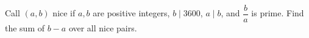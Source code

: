 Call $(a,b)$ nice if $a,b$ are positive integers, $b\mid3600$, $a\mid b$, and $\dfrac{b}{a}$ is prime. Find the sum of $b-a$ over all nice pairs.
